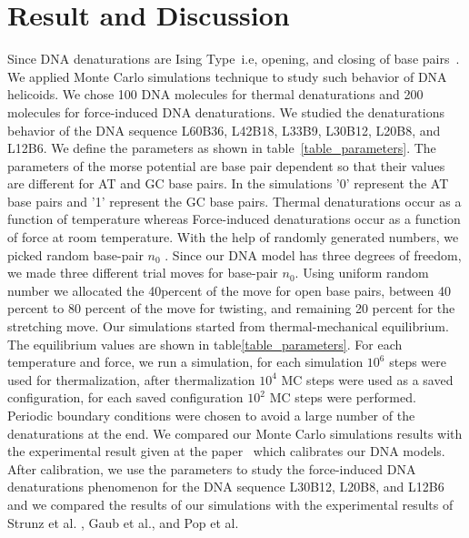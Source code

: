 \documentclass[12pt,masters,final]{UTRGVthesis}
\begin{document}
\chapter{Result and Discussion}
Since DNA denaturations are Ising Type \,i.e, opening, and closing of base pairs~\cite{poland1966d}. We applied Monte Carlo simulations technique to study such behavior of DNA helicoids. We chose 100 DNA molecules for thermal denaturations and 200 molecules for force-induced DNA denaturations. We studied the denaturations behavior of the  DNA sequence L60B36, L42B18, L33B9, L30B12, L20B8, and L12B6. We define the parameters as shown in table \,\ref{table_parameters}. The parameters of the morse potential are base pair dependent so that their values are different for AT and GC base pairs. In the simulations '0' represent the AT base pairs and '1' represent the GC base pairs. Thermal denaturations occur as a function of temperature whereas Force-induced denaturations occur as a function of force at room temperature. With the help of randomly generated numbers, we picked random base-pair $n_{0}$ . Since our DNA model has three degrees of freedom, we made three different trial moves for base-pair $n_0$. Using uniform random number we allocated the 40percent of the move for open base pairs, between 40 percent to 80 percent of the move for twisting, and remaining 20 percent for the stretching move. Our simulations started from thermal-mechanical equilibrium. The equilibrium values are shown in table\ref{table_parameters}. For each temperature and force, we run a simulation, for each simulation $10^6$ steps were used for thermalization, after thermalization $10^4$ MC steps were used as a saved configuration, for each saved configuration $10^2$ MC steps were performed. Periodic boundary conditions were chosen to avoid a large number of the denaturations at the end. We compared our Monte Carlo simulations results with the experimental result given at the paper~\cite{zeng2003length,zeng2004bubble} which calibrates our DNA models. After calibration, we use the parameters to study the force-induced DNA denaturations phenomenon for the DNA sequence L30B12, L20B8, and L12B6 and we compared the results of our simulations with the experimental results of Strunz et al. , Gaub et al., and Pop et al.~\cite{Strunz:1999, Pope:2001, Morfill:2007}
\end{document}
